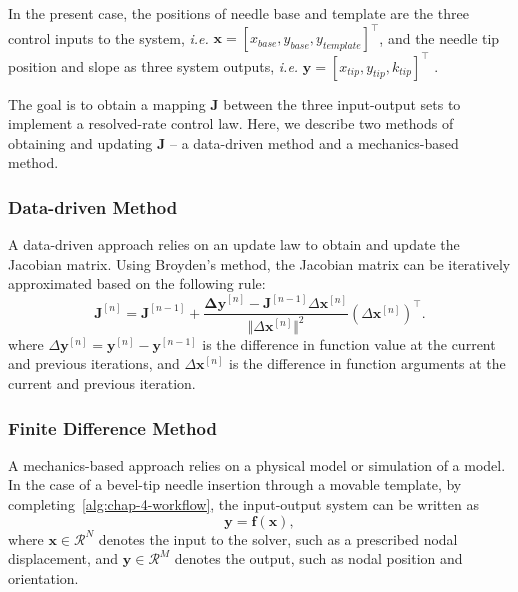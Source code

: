 In the present case, the positions of needle base and template are the three control inputs to the system, \textit{i.e.} $\mathbf{x} = [x_{base}, y_{base}, y_{template}]^{\top}$, and the needle tip position and slope as three system outputs, \textit{i.e.} $\mathbf{y} = [x_{tip}, y_{tip}, k_{tip}]^{\top}$ .

The goal is to obtain a mapping $\mathbf{J}$ between the three input-output sets to implement a resolved-rate control law. Here, we describe two methods of obtaining and updating $\mathbf{J}$ -- a data-driven method and a mechanics-based method.


\subsubsection{Data-driven Method}
\label{sec:chap-4-data-driven-control}
A data-driven approach relies on an update law to obtain and update the Jacobian matrix. Using Broyden's method, the Jacobian matrix can be iteratively approximated based on the following rule:
\begin{equation}
  \mathbf{J}^{[n]} = \mathbf{J}^{[n - 1]} + \frac{\mathbf{\Delta y}^{[n]} - \mathbf{J}^{[n - 1]}\Delta \mathbf{x}^{[n]}}{\Vert \Delta \mathbf{x}^{[n]}\Vert ^2} \left(\Delta \mathbf{x}^{[n]}\right)^{\top}. \label{eq:chap-4-update-law}
\end{equation}
where $\Delta \mathbf{y}^{[n]} = \mathbf{y}^{[n]} - \mathbf{y}^{[n - 1]}$ is the difference in function value at the current and previous iterations, and $\Delta \mathbf{x}^{[n]}$ is the difference in function arguments at the current and previous iteration. 

\subsubsection{Finite Difference Method}
\label{sec:chap-4-finite-difference-control}
A mechanics-based approach relies on a physical model or simulation of a model. In the case of a bevel-tip needle insertion through a movable template, by completing~\cref{alg:chap-4-workflow}, the input-output system can be written as
\begin{equation}
\mathbf{y} = \mathbf{f}(\mathbf{x}),
\end{equation}
where $\mathbf{x} \in \mathcal{R}^N$ denotes the input to the solver, such as a prescribed nodal displacement, and $\mathbf{y} \in \mathcal{R}^M$ denotes the output, such as nodal position and orientation.

